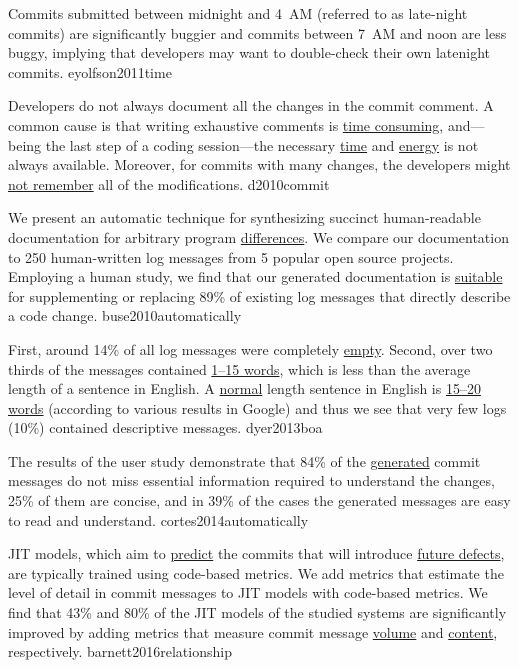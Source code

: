 \documentclass{article}
\begin{document}
  {Commits submitted between midnight and 4~AM (referred to as late-night commits) are significantly buggier and commits between 7~AM and noon are less buggy, implying that developers may want to double-check their own latenight commits.}
  {eyolfson2011time}


  {Developers do not always document all the changes in the commit comment. A common cause is that writing exhaustive comments is \ul{time consuming}, and---being the last step of a coding session---the necessary \ul{time} and \ul{energy} is not always available. Moreover, for commits with many changes, the developers might \ul{not remember} all of the modifications.}
  {d2010commit}

  {We present an automatic technique for synthesizing succinct human-readable documentation for arbitrary program \ul{differences}. We compare our documentation to 250 human-written log messages from 5 popular open source projects. Employing a human study, we find that our generated documentation is \ul{suitable} for supplementing or replacing 89\% of existing log messages that directly describe a code change.}
  {buse2010automatically}

  {First, around 14\% of all log messages were completely \ul{empty}. Second, over two thirds of the messages contained \ul{1–15 words}, which is less than the average length of a sentence in English. A \ul{normal} length sentence in English is \ul{15–20 words} (according to various results in Google) and thus we see that very few logs (10\%) contained descriptive messages.}
  {dyer2013boa}

  {The results of the user study demonstrate that 84\% of the \ul{generated} commit messages do not miss essential information required to understand the changes, 25\% of them are concise, and in 39\% of the cases the generated messages are easy to read and understand.}
  {cortes2014automatically}

  {JIT models, which aim to \ul{predict} the commits that will introduce \ul{future defects}, are typically trained using code-based metrics. We add metrics that estimate the level of detail in commit messages to JIT models with code-based metrics. We find that 43\% and 80\% of the JIT models of the studied systems are significantly improved by adding metrics that measure commit message \ul{volume} and \ul{content}, respectively.}
  {barnett2016relationship}
\end{document}
